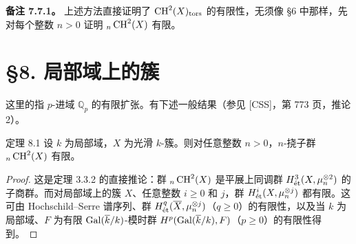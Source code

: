 \noindent\textbf{备注 7.7.1。} 上述方法直接证明了 $\operatorname{CH}^2(X)_{\mathrm{tors}}$ 的有限性，无须像 §6 中那样，先对每个整数 $n>0$ 证明 ${}_n\operatorname{CH}^2(X)$ 有限。

\section*{§8. 局部域上的簇}
这里的指 $p$-进域 $\mathbb Q_p$ 的有限扩张。有下述一般结果（参见 [CSS]，第 773 页，推论 2）。
\begin{statement}{定理 8.1}
设 $k$ 为局部域，$X$ 为光滑 $k$-簇。则对任意整数 $n>0$，$n$-挠子群 ${}_n\operatorname{CH}^2(X)$ 有限。
\end{statement}
\begin{proof}
这是定理 3.3.2 的直接推论：群 ${}_n\operatorname{CH}^2(X)$ 是平展上同调群 $H^3_{\mathrm{\acute et}}(X,\mu_n^{\otimes2})$ 的子商群。而对局部域上的簇 $X$、任意整数 $i\ge0$ 和 $j$，群 $H^i_{\mathrm{\acute et}}(X,\mu_n^{\otimes j})$ 都有限。这可由 Hochschild--Serre 谱序列、群 $H^q_{\mathrm{\acute et}}(\overline X,\mu_n^{\otimes j})$（$q\ge0$）的有限性，以及当 $k$ 为局部域、$F$ 为有限 $\operatorname{Gal}(\overline k/k)$-模时群 $H^p(\operatorname{Gal}(\overline k/k),F)$（$p\ge0$）的有限性得到。
\end{proof}


